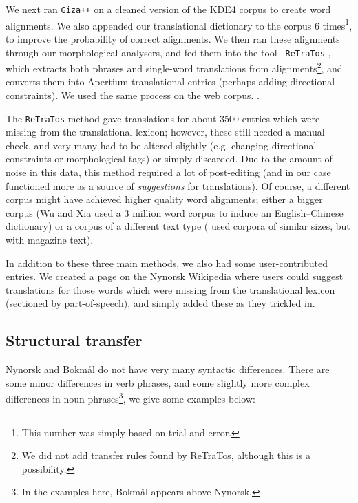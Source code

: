 \documentclass[11pt]{article}
\begin{document}
We next ran {\tt \small Giza++} \citep{och2003scv} on a cleaned
version of the KDE4 corpus to create word alignments. We also appended
our translational dictionary to the corpus 6 times\footnote{This
  number was simply based on trial and error.}, to improve the
probability of correct alignments. We then ran these alignments
through our morphological analysers, and fed them into the tool {\tt
  \small ReTraTos} \citep{caseli2006aib}, which extracts both phrases
and single-word translations from alignments\footnote{We did not add
  transfer rules found by ReTraTos, although this is a possibility.},
and converts them into Apertium translational entries (perhaps adding
directional constraints).  We used the same process on the web corpus.
.

The {\tt \small ReTraTos} method gave translations for about 3500
entries which were missing from the translational lexicon; however,
these still needed a manual check, and very many had to be altered
slightly (e.g.  changing directional constraints or morphological
tags) or simply discarded. Due to the amount of noise in this data,
this method required a lot of post-editing (and in our case functioned
more as a source of \emph{suggestions} for translations). Of course, a
different corpus might have achieved higher quality word alignments;
either a bigger corpus (Wu and Xia \citep[1994,
in][p.~230]{caseli2006aib} used a 3 million word corpus to induce an
English–Chinese dictionary) or a corpus of a different text type
(\citet{caseli2006aib} used corpora of similar sizes, but with
magazine text).

In addition to these three main methods, we also had some
user-contributed entries. We created a page on the Nynorsk Wikipedia
where users could suggest translations for those words which were
missing from the translational lexicon (sectioned by part-of-speech), and
simply added these as they trickled in.


\subsection{Structural transfer}
\label{sec:structural-transfer}
Nynorsk and Bokmål do not have very many syntactic differences. There
are some minor differences in verb phrases, and some slightly more
complex differences in noun phrases\footnote{In the examples here,
  Bokmål appears above Nynorsk.}, we give some examples below:
\end{document}
